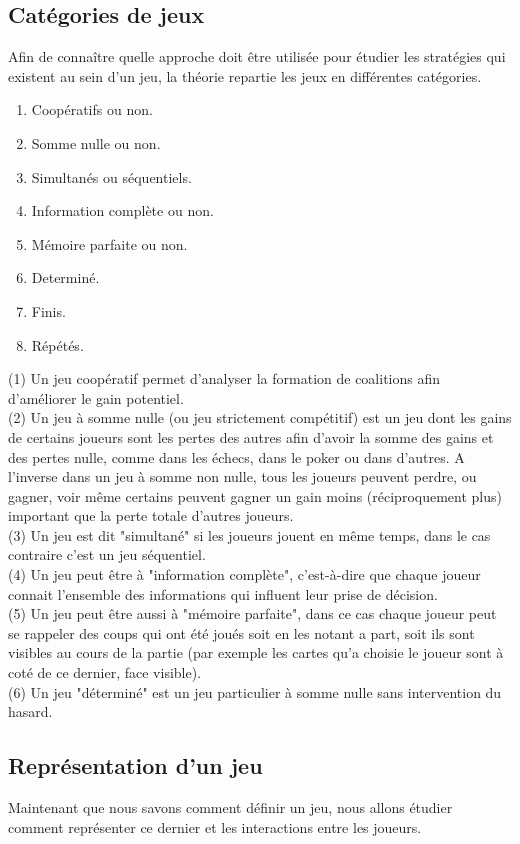 \documentclass[a4paper, 12pt, french]{article}
\begin{document}
	\subsection{Catégories de jeux}
	Afin de connaître quelle approche doit être utilisée pour étudier les stratégies qui existent au sein d'un jeu,
	la théorie repartie les jeux en différentes catégories\cite{wiki_theorie_jeux}.
	\begin{enumerate}
		\item Coopératifs ou non.
		\item Somme nulle ou non.
		\item Simultanés ou séquentiels.
		\item Information complète ou non.
		\item Mémoire parfaite ou non.
		\item Determiné.
		\item Finis.
		\item Répétés.
	\end{enumerate}
	(1) Un jeu coopératif permet d'analyser la formation de coalitions afin d'améliorer le gain potentiel. \\
	(2) Un jeu à somme nulle (ou jeu strictement compétitif) est un jeu dont les gains de certains joueurs
	sont les pertes des autres afin d'avoir la somme des gains et des pertes nulle, comme dans les échecs,
	dans le poker ou dans d'autres. A l'inverse dans un jeu à somme non nulle, tous les joueurs peuvent perdre,
	ou gagner, voir même certains peuvent gagner un gain moins (réciproquement plus) important que la perte totale
	d'autres joueurs.\\
	(3) Un jeu est dit "simultané" si les joueurs jouent en même temps, dans le cas contraire c'est un jeu séquentiel.\\
	(4) Un jeu peut être à "information complète", c'est-à-dire que chaque joueur connait l'ensemble des informations
	qui influent leur prise de décision.\\
	(5) Un jeu peut être aussi à "mémoire parfaite", dans ce cas chaque joueur peut se rappeler des coups qui ont été
	joués soit en les notant a part, soit ils sont visibles au cours de la partie (par exemple les cartes qu'a choisie
	le joueur sont à coté de ce dernier, face visible).\\
	(6) Un jeu "déterminé" est un jeu particulier à somme nulle sans intervention du hasard.

	\subsection{Représentation d'un jeu}
	Maintenant que nous savons comment définir un jeu, nous allons étudier comment représenter ce dernier et les
	interactions entre les joueurs.
\end{document}
